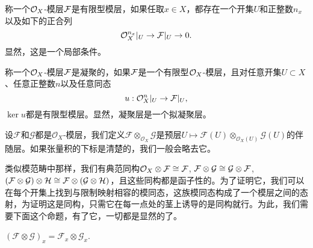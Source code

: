 
\begin{para}[有限型模层]
称一个$\mathcal{O}_X$-模层$\mathcal{F}$是有限型模层，如果任取$x\in X$，都存在一个开集$U$和正整数$n_x$以及如下的正合列
\[
	\mathcal{O}^{n_x}_X|_U\to \mathcal{F}|_U\to 0.
\]
显然，这是一个局部条件。
\end{para}

\begin{para}[凝聚层]
称一个$\mathcal{O}_X$-模层$\mathcal{F}$是凝聚的，如果$\mathcal{F}$是一个有限型$\mathcal{O}_X$-模层，且对任意开集$U\subset X$、任意正整数$n$以及任意同态
\[
	u:\mathcal{O}^{n}_X|_U\to \mathcal{F}|_U,
\]
$\ker u$都是有限型模层。显然，凝聚层是一个拟凝聚层。
\end{para}

\begin{para}
设$\mathcal{F}$和$\mathcal{G}$都是$\mathcal{O}_X$-模层，我们定义$\mathcal{F}\otimes_{\mathcal{O}_X}\mathcal{G}$是预层$U\mapsto \mathcal{F}(U)\otimes_{\mathcal{O}_X(U)}\mathcal{G}(U)$的伴随层。如果张量积的下标是清楚的，我们一般会略去它。

类似模范畴中那样，我们有典范同构$\mathcal{O}_X\otimes \mathcal{F}\cong \mathcal{F}$, $\mathcal{F}\otimes \mathcal{G}\cong \mathcal{G}\otimes \mathcal{F}$, $(\mathcal{F}\otimes \mathcal{G}) \otimes \mathcal{H}\cong \mathcal{F}\otimes (\mathcal{G} \otimes \mathcal{H})$，且这些同构都是函子性的。为了证明它，我们可以在每个开集上找到与限制映射相容的模同态，这族模同态构成了一个模层之间的态射，为证明这是同构，只需它在每一点处的茎上诱导的是同构就行。为此，我们需要下面这个命题，有了它，一切都是显然的了。
\end{para}

\begin{pro}
$(\mathcal{F}\otimes\mathcal{G})_x=\mathcal{F}_x\otimes\mathcal{G}_x$.
\end{pro}

